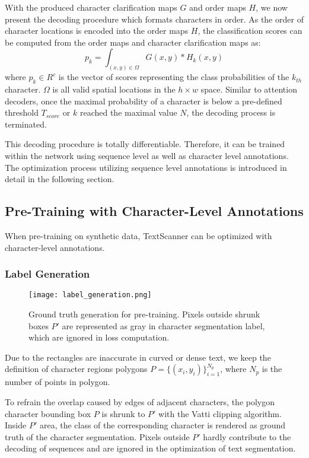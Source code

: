 \documentclass[letterpaper]{article} \usepackage{aaai20}  \usepackage{times}  \usepackage{helvet} \usepackage{courier}  \usepackage[hyphens]{url}  \usepackage{graphicx} \urlstyle{rm} \def\UrlFont{\rm}  \usepackage{graphicx}  \frenchspacing  \setlength{\pdfpagewidth}{8.5in}  \setlength{\pdfpageheight}{11in}
\begin{document}
With the produced character clarification maps $G$ and order maps $H$, we now present the decoding procedure which formats characters in order. As the order of character locations is encoded into the order maps $H$, the classification scores can be computed from the order maps and character clarification maps as:
\begin{equation}
    p_{k} = \int_{(x,y) \in \Omega}{G(x, y) * H_{k}(x,y)}
\end{equation}
where $p_{k} \in R^{c}$ is the vector of scores representing the class probabilities of the $k_{th}$ character. $\Omega$ is all valid spatial locations in the $h \times w$ space. Similar to attention decoders, once the maximal probability of a character is below a pre-defined threshold $T_{score}$ or $k$ reached the maximal value $N$, the decoding process is terminated.


This decoding procedure is totally differentiable. Therefore, it can be trained within the network using sequence level as well as character level annotations. The optimization process utilizing sequence level annotations is introduced in detail in the following section.


\subsection{Pre-Training with Character-Level Annotations}
When pre-training on synthetic data, TextScanner can be optimized with character-level annotations.

\subsubsection{Label Generation}

\begin{figure}[t]
    \centering
    \texttt{[image: label\_generation.png]}
    \caption{Ground truth generation for pre-training. Pixels outside shrunk boxes $P'$ are represented as gray in character segmentation label, which are ignored in loss computation.}
    \label{fig:labelgeneration}
\end{figure}

Due to the rectangles are inaccurate 
in curved or dense text, we keep the definition of character regions polygons
$P=\{(x_{i}, y_{i})\}_{i=1}^{N_{p}}$, where $N_{p}$ is the number of points in polygon.

To refrain the overlap caused by edges of adjacent characters, the polygon character bounding box $P$ is shrunk to $P'$ with the Vatti clipping algorithm\cite{vati}. Inside $P'$ area, the class of the corresponding character is rendered as ground truth of the character segmentation. Pixels outside $P'$ hardly contribute to the decoding of sequences and are ignored in the optimization of text segmentation.
\end{document}
